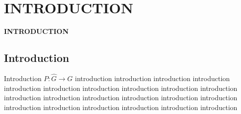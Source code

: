 \chapter{INTRODUCTION}

\pagebreak

\begin{center}
{\LARGE\textbf{INTRODUCTION}}
\end{center}


\section{Introduction}
Introduction \begin{math} P: \widehat{G} \rightarrow G \end{math} introduction introduction introduction introduction introduction introduction introduction introduction introduction introduction introduction introduction introduction introduction introduction introduction introduction introduction introduction introduction introduction introduction 


